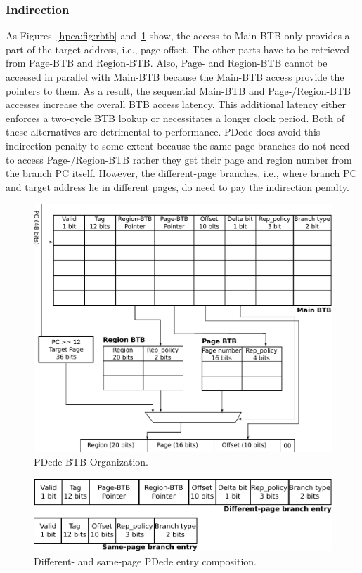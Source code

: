\subsubsection{Indirection} As Figures~\ref{hpca:fig:rbtb} and~\ref{hpca:fig:pdede} show, the access to Main-BTB only provides a part of the target address, i.e., page offset. The other parts have to be retrieved from Page-BTB and Region-BTB. Also, Page- and Region-BTB cannot be accessed in parallel with Main-BTB because the Main-BTB access provide the pointers to them. As a result, the sequential Main-BTB and Page-/Region-BTB accesses increase the overall BTB access latency. This additional latency either enforces a two-cycle BTB lookup or necessitates a longer clock period. Both of these alternatives are detrimental to performance.  PDede does avoid this indirection penalty to some extent because the same-page branches do not need to access Page-/Region-BTB rather they get their page and region number from the branch PC itself. However, the different-page branches, i.e., where branch PC and target address lie in different pages, do need to pay the indirection penalty.

\begin{figure}
\centering
\includegraphics[width=.9\columnwidth, trim=0 0 0 10, clip]{figures/fig_9a.pdf}
\caption{PDede BTB Organization.}
\label{hpca:fig:pdede}
\end{figure}

\begin{figure}
\centering
\includegraphics[width=.9\columnwidth, trim=0 0 0 0, clip]{figures/PDede_branch_entries.pdf}
\caption{Different- and same-page PDede entry composition.}
\label{hpca:fig:pdedeEntry}
\end{figure}


